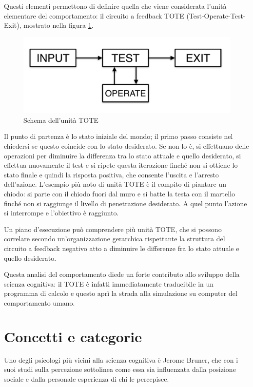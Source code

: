 Questi elementi permettono di definire quella che viene considerata l’unità elementare del comportamento: il circuito a feedback TOTE (Test-Operate-Test-Exit), mostrato nella figura \ref{fig:tote}.

\begin{figure}[hbt]
  \centering
  \includegraphics[width=\textwidth]{img/TOTE.png}
  \caption{Schema dell'unità TOTE}
  \label{fig:tote}
\end{figure}

Il punto di partenza è lo stato iniziale del mondo; il primo passo consiste nel chiedersi se questo coincide con lo stato desiderato. Se non lo è, si effettuano delle operazioni per diminuire la differenza tra lo stato attuale e quello desiderato, si effettua nuovamente il test e si ripete questa iterazione finché non si ottiene lo stato finale e quindi la risposta positiva, che consente l’uscita e l’arresto dell’azione. L’esempio più noto di unità TOTE è il compito di piantare un chiodo: si parte con il chiodo fuori dal muro e si batte la testa con il martello finché non si raggiunge il livello di penetrazione desiderato. A quel punto l’azione si interrompe e l’obiettivo è raggiunto.

Un piano d’esecuzione può comprendere più unità TOTE, che si possono correlare secondo un’organizzazione gerarchica rispettante la struttura del circuito a feedback negativo atto a diminuire le differenze fra lo stato attuale e quello desiderato.

Questa analisi del comportamento diede un forte contributo allo sviluppo della scienza cognitiva: il TOTE è infatti immediatamente traducibile in un programma di calcolo e questo aprì la strada alla simulazione su computer del comportamento umano.

\section{Concetti e categorie}
Uno degli psicologi più vicini alla scienza cognitiva è Jerome Bruner, che con i suoi studi sulla percezione sottolinea come essa sia influenzata dalla posizione sociale e dalla personale esperienza di chi le percepisce.

